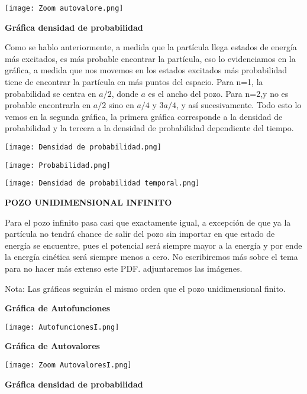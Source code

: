 \documentclass{article}
\begin{document}
\medskip


\texttt{[image: Zoom autovalore.png]}

\medskip

\textbf{Gráfica densidad de probabilidad}


Como se hablo anteriormente, a medida que la partícula llega estados de energía más excitados, es más probable encontrar la partícula, eso lo evidenciamos en la gráfica, a medida que nos movemos en los estados excitados más probabilidad tiene de encontrar la partícula en más puntos del espacio. Para n=1, la probabilidad se centra en $a/2$, donde $a$ es el ancho del pozo. Para n=2,y no es probable encontrarla en $a/2$ sino en $a/4$ y $3a/4$, y así sucesivamente. Todo esto lo vemos en la segunda gráfica, la primera gráfica corresponde a la densidad de probabilidad y la tercera a la densidad de probabilidad dependiente del tiempo.

\texttt{[image: Densidad de probabilidad.png]}

\texttt{[image: Probabilidad.png]}

\texttt{[image: Densidad de probabilidad temporal.png]}

\textbf{POZO UNIDIMENSIONAL INFINITO}

Para el pozo infinito pasa casi que exactamente igual, a excepción de que ya la partícula no tendrá chance de salir del pozo sin importar en que estado de energía se encuentre, pues el potencial será siempre mayor a la energía y por ende la energía cinética será siempre menos a cero. No escribiremos más sobre el tema para no hacer más extenso este PDF. adjuntaremos las imágenes. 
\medskip

Nota: Las gráficas seguirán el mismo orden que el pozo unidimensional finito.

\medskip

\textbf{Gráfica de Autofunciones}

\medskip

\texttt{[image: AutofuncionesI.png]}

\medskip

\textbf{Gráfica de Autovalores}

\medskip

\texttt{[image: Zoom AutovaloresI.png]}

\medskip

\textbf{Gráfica densidad de probabilidad}
\end{document}
